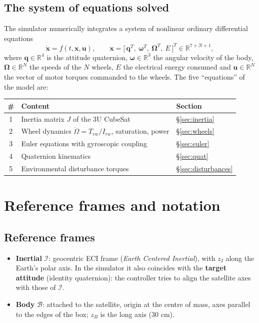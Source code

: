 \documentclass[11pt,a4paper]{article}
\newcommand{\vect}[1]{\bm{#1}}
\newcommand{\w}{\vect{\omega}}
\newcommand{\q}{\vect{q}}
\begin{document}
\subsection{The system of equations solved}
The simulator numerically integrates a system of nonlinear ordinary
differential equations
\begin{equation}
  \dot{\vect{x}} = f(t,\vect{x},\vect{u}),\qquad
  \vect{x} = \big[\,\q^T,\ \w^T,\ \vect{\Omega}^T,\ E\,\big]^T \in \mathbb{R}^{7+N+1},
  \label{eq:state}
\end{equation}
where $\q\in\mathbb{R}^4$ is the attitude quaternion, $\w\in\mathbb{R}^3$ the
angular velocity of the body, $\vect\Omega\in\mathbb{R}^N$ the speeds of the $N$
wheels, $E$ the electrical energy consumed and $\vect{u}\in\mathbb{R}^N$ the
vector of motor torques commanded to the wheels. The five ``equations'' of the
model are:
\begin{center}
\begin{tabular}{cll}
\toprule
\# & Content & Section\\
\midrule
1 & Inertia matrix $J$ of the 3U CubeSat & \S\ref{sec:inertia}\\
2 & Wheel dynamics $\dot\Omega = T_{rw}/I_{rw}$, saturation, power & \S\ref{sec:wheels}\\
3 & Euler equations with gyroscopic coupling & \S\ref{sec:euler}\\
4 & Quaternion kinematics & \S\ref{sec:quat}\\
5 & Environmental disturbance torques & \S\ref{sec:disturbances}\\
\bottomrule
\end{tabular}
\end{center}

\section{Reference frames and notation}\label{sec:frames}

\subsection{Reference frames}
\begin{itemize}
  \item \textbf{Inertial} $\mathcal{I}$: geocentric ECI frame (\emph{Earth
        Centered Inertial}), with $z_I$ along the Earth's polar axis. In the
        simulator it also coincides with the \textbf{target attitude} (identity
        quaternion): the controller tries to align the satellite axes with
        those of $\mathcal{I}$.
  \item \textbf{Body} $\mathcal{B}$: attached to the satellite, origin at the
        centre of mass, axes parallel to the edges of the box; $z_B$ is the
        long axis (30 cm).
\end{itemize}
\end{document}
